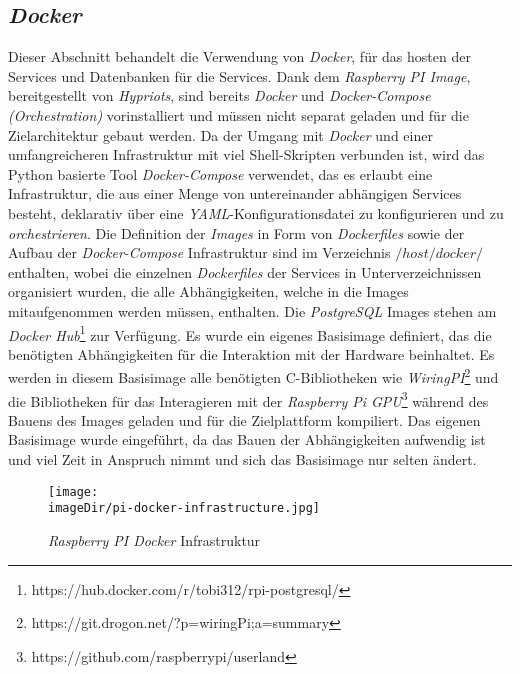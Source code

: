 \subsection{\emph{Docker}}
Dieser Abschnitt behandelt die Verwendung von \emph{Docker}, für das hosten der Services und Datenbanken für die Services. Dank dem \emph{Raspberry PI Image}, bereitgestellt von \emph{Hypriots}, sind bereits \emph{Docker} und \emph{Docker-Compose} \emph{(Orchestration)} vorinstalliert und müssen nicht separat geladen und für die Zielarchitektur gebaut werden.
\newline
\newline
Da der Umgang mit \emph{Docker} und einer umfangreicheren Infrastruktur mit viel Shell-Skripten verbunden ist, wird das Python basierte Tool \emph{Docker-Compose} verwendet, das es erlaubt eine Infrastruktur, die aus einer Menge von untereinander abhängigen Services besteht, deklarativ über eine \emph{YAML}-Konfigurationsdatei zu konfigurieren und zu \emph{orchestrieren}. 
\newline
\newline
Die Definition der \emph{Images} in Form von \emph{Dockerfiles} sowie der Aufbau der \emph{Docker-Compose} Infrastruktur sind im Verzeichnis \emph{$/host/docker/$} enthalten, wobei die einzelnen \emph{Dockerfiles} der Services in Unterverzeichnissen organisiert wurden, die alle Abhängigkeiten, welche in die Images mitaufgenommen werden müssen, enthalten. Die \emph{PostgreSQL} Images stehen am \emph{Docker Hub}\footnote{https://hub.docker.com/r/tobi312/rpi-postgresql/} zur Verfügung. Es wurde ein eigenes Basisimage definiert, das die benötigten Abhängigkeiten für die Interaktion mit der Hardware beinhaltet. Es werden in diesem Basisimage alle benötigten C-Bibliotheken wie \emph{WiringPI}\footnote{https://git.drogon.net/?p=wiringPi;a=summary} und die Bibliotheken für das Interagieren mit der \emph{Raspberry Pi GPU}\footnote{https://github.com/raspberrypi/userland} während des Bauens des Images geladen und für die Zielplattform kompiliert. Das eigenen Basisimage wurde eingeführt, da das Bauen der Abhängigkeiten aufwendig ist und viel Zeit in Anspruch nimmt und sich das Basisimage nur selten ändert.
\begin{center}
	\begin{figure}[h]
		\centering
		\texttt{[image: \\imageDir/pi-docker-infrastructure.jpg]}
		\caption{\emph{Raspberry PI Docker} Infrastruktur}
		\label{fig:rapsi-docker-infrastructure}
	\end{figure}
\end{center}
